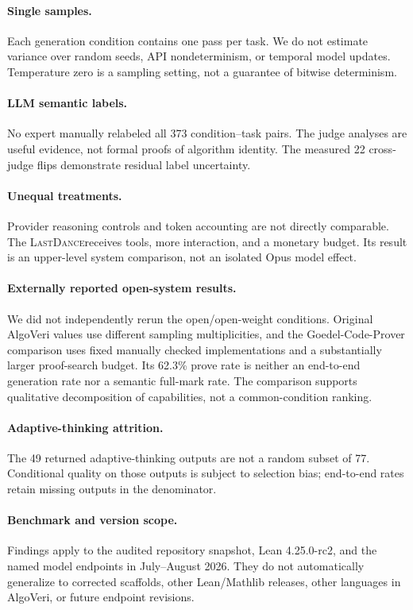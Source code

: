 \documentclass{article}
\newcommand{\lastdance}{\textsc{LastDance}}
\begin{document}
\paragraph{Single samples.}
Each generation condition contains one pass per task.  We do not estimate variance over
random seeds, API nondeterminism, or temporal model updates.  Temperature zero is a
sampling setting, not a guarantee of bitwise determinism.

\paragraph{LLM semantic labels.}
No expert manually relabeled all 373 condition--task pairs.  The judge analyses are
useful evidence, not formal proofs of algorithm identity.  The measured 22 cross-judge
flips demonstrate residual label uncertainty.

\paragraph{Unequal treatments.}
Provider reasoning controls and token accounting are not directly comparable.  The
\lastdance receives tools, more interaction, and a monetary budget.  Its result is an
upper-level system comparison, not an isolated Opus model effect.

\paragraph{Externally reported open-system results.}
We did not independently rerun the open/open-weight conditions.  Original AlgoVeri
values use different sampling multiplicities, and the Goedel-Code-Prover comparison
uses fixed manually checked implementations and a substantially larger proof-search
budget.  Its 62.3\% prove rate is neither an end-to-end generation rate nor a semantic
full-mark rate.  The comparison supports qualitative decomposition of capabilities,
not a common-condition ranking.

\paragraph{Adaptive-thinking attrition.}
The 49 returned adaptive-thinking outputs are not a random subset of 77.  Conditional
quality on those outputs is subject to selection bias; end-to-end rates retain missing
outputs in the denominator.

\paragraph{Benchmark and version scope.}
Findings apply to the audited repository snapshot, Lean 4.25.0-rc2, and the named model
endpoints in July--August 2026.  They do not automatically generalize to corrected
scaffolds, other Lean/Mathlib releases, other languages in AlgoVeri, or future endpoint
revisions.
\end{document}
